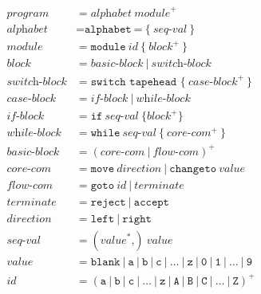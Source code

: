 \documentclass{amsart}
\theoremstyle{definition}
\begin{document}
    \begin{align*}
        \textit{program} &= \textit{alphabet} \ \textit{module}^+ \\
        \textit{alphabet} &= \texttt{alphabet} \ \texttt{=} \ \texttt{\{} \ \textit{seq-val} \ \texttt{\}} \\
        \textit{module} &= \texttt{module} \ \textit{id} \ \texttt{\{} \ \textit{block}^+ \ \texttt{\}} \\
        \textit{block} &= \textit{basic-block} \ | \ \textit{switch-block} \\
        \textit{switch-block} &= \texttt{switch tapehead \{} \ \textit{case-block}^+ \ \texttt{\}} \\
        \textit{case-block} &= \textit{if-block} \ | \ \textit{while-block} \\
        \textit{if-block} &= \texttt{if} \ \textit{seq-val} \ \texttt{\{} \textit{block}^+ \texttt{\}} \\
        \textit{while-block} &= \texttt{while} \ \textit{seq-val} \ \texttt{\{} \ \textit{core-com}^+ \ \texttt{\}} \\
        \textit{basic-block} &= (\textit{core-com} \ | \ \textit{flow-com})^+ \\
        \textit{core-com} &= \texttt{move} \ \textit{direction} \ | \ \texttt{changeto} \ \textit{value} \\
        \textit{flow-com} &= \texttt{goto} \ \textit{id} \ | \ \textit{terminate} \\
        \textit{terminate} &= \texttt{reject} \ | \ \texttt{accept} \\
        \textit{direction} &= \texttt{left} \ | \ \texttt{right} \\
        \textit{seq-val} &= (\textit{value}^* \texttt{,}) \ \textit{value} \\
        \textit{value} &= \texttt{blank} \ | \ \texttt{a} \ | \ \texttt{b} \ | \ \texttt{c} \ | \ \dots \ | \ \texttt{z} \ | \ \texttt{0} \ | \ \texttt{1} \ | \ \dots \ | \ \texttt{9} \\
        \textit{id} &= (\texttt{a} \ | \ \texttt{b} \ | \ \texttt{c} \ | \ \dots \ | \ \texttt{z} \ | \ \texttt{A} \ | \ \texttt{B} \ | \ \texttt{C} \ | \ \dots \ | \ \texttt{Z})^+
    \end{align*}
    
\end{document}
